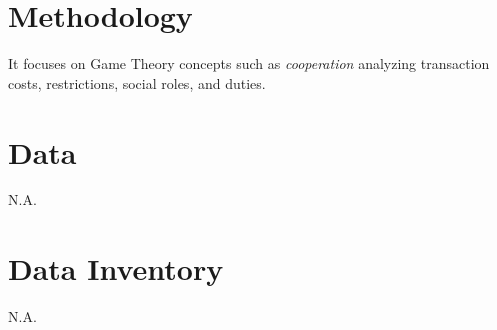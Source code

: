 \documentclass[9pt,twocolumn,twoside,]{pnas-new}
\begin{document}
\hypertarget{methodology}{%
\section*{Methodology}\label{methodology}}

It focuses on Game Theory concepts such as \emph{cooperation} analyzing
transaction costs, restrictions, social roles, and duties.

\hypertarget{data}{%
\section*{Data}\label{data}}

N.A.

\hypertarget{data-inventory}{%
\section*{Data Inventory}\label{data-inventory}}

N.A.

\showmatmethods
\showacknow
\pnasbreak



% 
\end{document}
